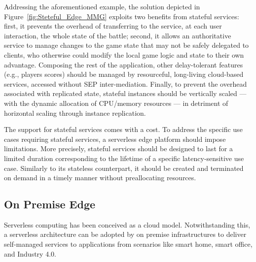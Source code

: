 Addressing the aforementioned example, the solution depicted in Figure~\ref{fig:Steteful_Edge_MMG} exploits two benefits from stateful services: first, it prevents the overhead of transferring to the service, at each user interaction, the whole state of the battle; second, it allows an authoritative service to manage changes to the game state that may not be safely delegated to clients, who otherwise could modify the local game logic and state to their own advantage.
Composing the rest of the application, other delay-tolerant features (e.g., players scores) should be managed by resourceful, long-living cloud-based services, accessed without SEP inter-mediation. Finally, to prevent the overhead associated with replicated state, stateful instances should be vertically scaled --- with the dynamic allocation of CPU/memory resources --- in detriment of horizontal scaling through instance replication. %

The support for stateful services comes with a cost. To address the specific use cases requiring stateful services, a serverless edge platform should impose limitations. More precisely, stateful services should be designed to last for a limited duration corresponding to the lifetime of a specific latency-sensitive use case. Similarly to its stateless counterpart, it should be created and terminated on demand in a timely manner without preallocating resources.





\subsection{On Premise Edge}

Serverless computing has been conceived as a cloud model. Notwithstanding this, a serverless architecture can be adopted by on premise infrastructures to deliver self-managed services to applications from scenarios like smart home, smart office, and Industry 4.0. 




